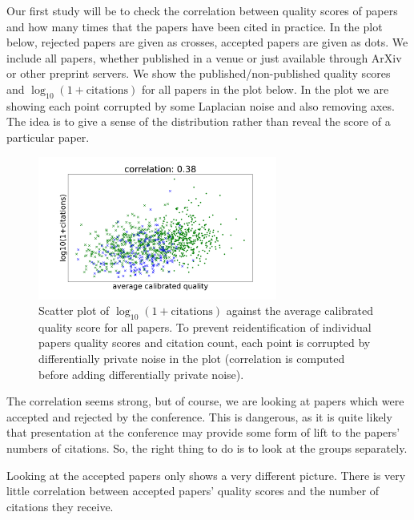 Our first study will be to check the correlation between quality scores
of papers and how many times that the papers have been cited in
practice. In the plot below, rejected papers are given as crosses,
accepted papers are given as dots. We include all papers, whether
published in a venue or just available through ArXiv or other preprint
servers. We show the published/non-published quality scores and
\(\log_{10}(1+\text{citations})\) for all papers in the plot below. In
the plot we are showing each point corrupted by some Laplacian noise and
also removing axes. The idea is to give a sense of the distribution
rather than reveal the score of a particular paper.

\begin{figure}[htb]
\includegraphics[width=0.70\textwidth]{diagrams/neurips/citations-vs-average-calibrated-quality-all.pdf}


\caption{Scatter plot of $\log_{10}(1+\text{citations})$ against the average calibrated quality score for all papers. To prevent reidentification of individual papers quality scores and citation count, each point is corrupted by differentially private noise in the plot (correlation is computed before adding differentially private noise).}
\label{citations-vs-average-calibrated-quality-all}
\end{figure}

The correlation seems strong, but of course, we are looking at papers
which were accepted and rejected by the conference. This is dangerous,
as it is quite likely that presentation at the conference may provide
some form of lift to the papers' numbers of citations. So, the right
thing to do is to look at the groups separately.

Looking at the accepted papers only shows a very different picture.
There is very little correlation between accepted papers' quality scores
and the number of citations they receive.

